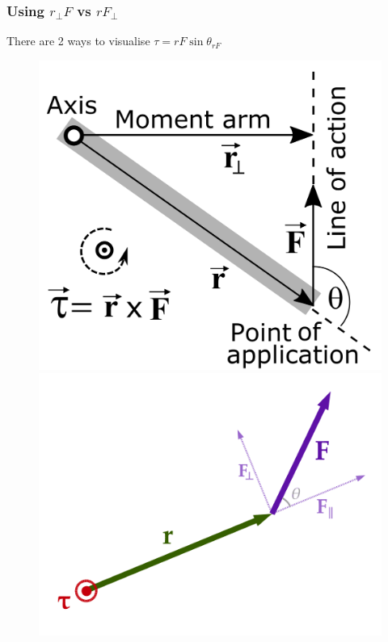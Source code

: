 \documentclass{article}
\begin{document}
\subsubsection{Using $r_\perp F$ vs $r F_\perp$}
There are 2 ways to visualise $\tau = rF \sin \theta_{rF}$\\[0pt]
{
\begin{figure} 
\includegraphics[width=\linewidth]{images/lineofaction.png}
\\[20pt]
\includegraphics[width=\linewidth]{images/fperp.png}

\end{figure}}
\end{document}
